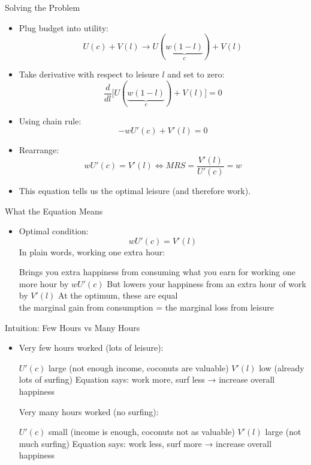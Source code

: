\documentclass[10pt,aspectratio=169]{beamer}
\begin{document}
\begin{frame}{Solving the Problem}

\begin{itemize}
\item Plug budget into utility:
\[
U(c) + V(l) \longrightarrow U(\underbrace{w (1-l)}_{c}) + V(l)
\]
\vspace{-0.3cm}
\item Take derivative with respect to leisure \(l\) and set to zero:
\[
\frac{d}{dl} \big[ U(\underbrace{w (1-l)}_{c}) + V(l) \big] = 0
\]
\item Using chain rule:
\[
-w U'(c) + V'(l) = 0
\]
\item Rearrange:
\[
w U'(c) = V'(l) \Leftrightarrow  MRS=\dfrac{V'(l)}{U'(c)}=w
\]
\item This equation tells us the optimal leisure (and therefore work).
\end{itemize}
\end{frame}

\begin{frame}{What the Equation Means}

\begin{itemize}
\item Optimal condition:
\[
w U'(c) = V'(l)
\]
\itemvso In plain words, working one extra hour:
\begin{itemize}
    \itemvso Brings you extra happiness from consuming what you earn for working one more hour by \(w U'(c)\)
    \itemvso But lowers your happiness from an extra hour of work by \(V'(l)\)
    \itemvso At the optimum, these are equal\\
    \vspace{0.3cm}
     the marginal gain from consumption = the marginal loss from leisure
\end{itemize}
\end{itemize}

\end{frame}


\begin{frame}{Intuition: Few Hours vs Many Hours}

\begin{itemize}
\item Very few hours worked (lots of leisure):
\begin{itemize}
    \itemvso \(U'(c)\) large (not enough income, coconuts are valuable)
    \itemvso \(V'(l)\) low (already lots of surfing)
    \itemvso Equation says: work more, surf less → increase overall happiness
\end{itemize}

\itemvso Very many hours worked (no surfing):
\begin{itemize}
    \itemvso \(U'(c)\) small (income is enough, coconuts not as valuable)
    \itemvso \(V'(l)\) large (not much surfing)
    \itemvso Equation says: work less, surf more → increase overall happiness
\end{itemize}
\end{itemize}

\end{frame}
\end{document}
